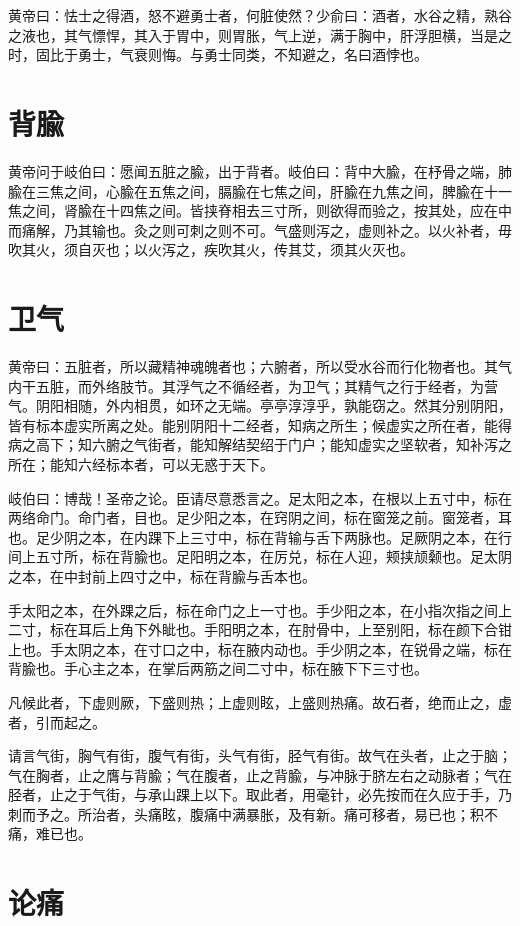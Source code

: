 \documentclass[a4paper,12pt,UTF8,twoside]{ctexbook}
\begin{document}
	黄帝曰：怯士之得酒，怒不避勇士者，何脏使然？少俞曰：酒者，水谷之精，熟谷之液也，其气慓悍，其入于胃中，则胃胀，气上逆，满于胸中，肝浮胆横，当是之时，固比于勇士，气衰则悔。与勇士同类，不知避之，名曰酒悖也。
	\chapter{背腧}
	
	黄帝问于岐伯曰：愿闻五脏之腧，出于背者。岐伯曰：背中大腧，在杼骨之端，肺腧在三焦之间，心腧在五焦之间，膈腧在七焦之间，肝腧在九焦之间，脾腧在十一焦之间，肾腧在十四焦之间。皆挟脊相去三寸所，则欲得而验之，按其处，应在中而痛解，乃其输也。灸之则可刺之则不可。气盛则泻之，虚则补之。以火补者，毋吹其火，须自灭也；以火泻之，疾吹其火，传其艾，须其火灭也。
	\chapter{卫气}
	
	黄帝曰：五脏者，所以藏精神魂魄者也；六腑者，所以受水谷而行化物者也。其气内干五脏，而外络肢节。其浮气之不循经者，为卫气；其精气之行于经者，为营气。阴阳相随，外内相贯，如环之无端。亭亭淳淳乎，孰能窃之。然其分别阴阳，皆有标本虚实所离之处。能别阴阳十二经者，知病之所生；候虚实之所在者，能得病之高下；知六腑之气街者，能知解结契绍于门户；能知虚实之坚软者，知补泻之所在；能知六经标本者，可以无惑于天下。
	
	岐伯曰：博哉！圣帝之论。臣请尽意悉言之。足太阳之本，在根以上五寸中，标在两络命门。命门者，目也。足少阳之本，在窍阴之间，标在窗笼之前。窗笼者，耳也。足少阴之本，在内踝下上三寸中，标在背输与舌下两脉也。足厥阴之本，在行间上五寸所，标在背腧也。足阳明之本，在厉兑，标在人迎，颊挟颃颡也。足太阴之本，在中封前上四寸之中，标在背腧与舌本也。
	
	手太阳之本，在外踝之后，标在命门之上一寸也。手少阳之本，在小指次指之间上二寸，标在耳后上角下外眦也。手阳明之本，在肘骨中，上至别阳，标在颜下合钳上也。手太阴之本，在寸口之中，标在腋内动也。手少阴之本，在锐骨之端，标在背腧也。手心主之本，在掌后两筋之间二寸中，标在腋下下三寸也。
	
	凡候此者，下虚则厥，下盛则热；上虚则眩，上盛则热痛。故石者，绝而止之，虚者，引而起之。
	
	请言气街，胸气有街，腹气有街，头气有街，胫气有街。故气在头者，止之于脑；气在胸者，止之膺与背腧；气在腹者，止之背腧，与冲脉于脐左右之动脉者；气在胫者，止之于气街，与承山踝上以下。取此者，用毫针，必先按而在久应于手，乃刺而予之。所治者，头痛眩，腹痛中满暴胀，及有新。痛可移者，易已也；积不痛，难已也。
	\chapter{论痛}
	
\end{document}
